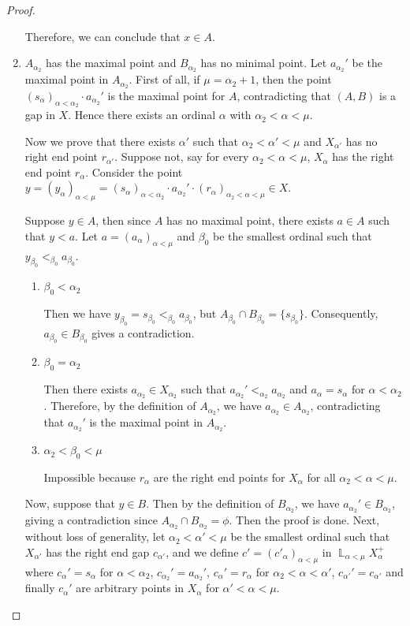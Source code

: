 \documentclass[12pt,oneside,english]{amsbook}
\numberwithin{equation}{section} %
\numberwithin{figure}{section} %
\theoremstyle{plain}
\numberwithin{section}{chapter}
\theoremstyle{plain}
\DeclareMathOperator{\LP}{\mathbb{L}}
\begin{document}
\begin{proof}
\begin{enumerate}
      Therefore, we can conclude that $x  \in  A$. 
   

    \item $A_{\alpha_{2}}$ has the maximal point and $B_{\alpha_{2}}$ has no minimal point.
      Let $a_{\alpha_{2}}'$ be the maximal point in $A_{\alpha_{2}}$. First of all, if $\mu = \alpha_2 + 1$, then the point $(s_{\alpha})_{\alpha < \alpha_2} \cdot a_{\alpha_2}'$ is the maximal point for $A$, contradicting that $(A,B)$ is a gap in $X$. Hence there exists an ordinal $\alpha$ with $\alpha_2 < \alpha < \mu$.
      
    Now we prove that there exists $\alpha'$ such that $\alpha_{2} < \alpha' < \mu$ and $X_{\alpha'}$ has no right end point $r_{\alpha'}$. Suppose not, say for every $\alpha_2 < \alpha < \mu$, $X_{\alpha}$ has the right end point $r_{\alpha}$. Consider the point $y = (y_{\alpha})_{\alpha < \mu} = (s_{\alpha})_{\alpha < \alpha_{2}} \cdot a_{\alpha_{2}}' \cdot (r_{\alpha})_{\alpha_{2} < \alpha < \mu}  \in  X$.

    Suppose $y \in A$, then since $A$ has no maximal point, there exists $a \in  A$ such that $y < a$. Let $a  =  (a_{\alpha})_{\alpha < \mu}$ and $\beta_{0}$ be the smallest ordinal such that $y_{\beta_{0}} <_{\beta_{0}} a_{\beta_{0}}$.
      \begin{enumerate}
      \item $\beta_{0} < \alpha_{2}$
        
        Then we have $y_{\beta_{0}}  =  s_{\beta_{0}} <_{\beta_{0}} a_{\beta_{0}}$, but $A_{\beta_{0}} \cap B_{\beta_{0}}  =  \{ s_{\beta_{0}} \}$. Consequently, $a_{\beta_{0}}  \in  B_{\beta_{0}}$ gives a  contradiction.
      \item $\beta_{0}  =  \alpha_{2}$
        
        Then there exists $a_{\alpha_{2}}  \in  X_{\alpha_{2}}$ such that $a_{\alpha_{2}}' <_{\alpha_{2}} a_{\alpha_{2}}$ and $a_{\alpha} = s_{\alpha}$ for $\alpha < \alpha_2$. Therefore, by the definition of $A_{\alpha_2}$, we have $a_{\alpha_{2}}  \in  A_{\alpha_{2}}$, contradicting that $a_{\alpha_{2}}'$ is the maximal point in $A_{\alpha_{2}}$.

      \item $\alpha_{2} < \beta_{0} < \mu$
        
        Impossible because $r_{\alpha}$ are the right end points for $X_{\alpha}$ for all $\alpha_{2} < \alpha < \mu$.
      \end{enumerate}
      Now, suppose that $y  \in  B$. Then by the definition of $B_{\alpha_{2}}$, we have $a_{\alpha_{2}}'  \in  B_{\alpha_{2}}$, giving a contradiction since $A_{\alpha_{2}} \cap B_{\alpha_{2}}  =  \phi$. Then the proof is done. Next, without loss of generality, let $\alpha_2 < \alpha' < \mu$ be the smallest ordinal such that $X_{\alpha'}$ has the right end gap $c_{\alpha'}$, and we define $c' =(c'_{\alpha})_{\alpha < \mu}$ in $\LP_{\alpha < \mu}X^+_{\alpha}$ where $c_{\alpha}' = s_{\alpha}$ for $\alpha < \alpha_2$, $c_{\alpha_2}' = a_{\alpha_2}'$, $c_{\alpha}' = r_{\alpha}$ for $\alpha_2 < \alpha < \alpha'$, $c_{\alpha'}' = c_{\alpha'}$ and finally $c_{\alpha}'$ are arbitrary points in $X_{\alpha}$ for $\alpha' < \alpha < \mu$.


\end{enumerate}
\end{proof}
\end{document}
